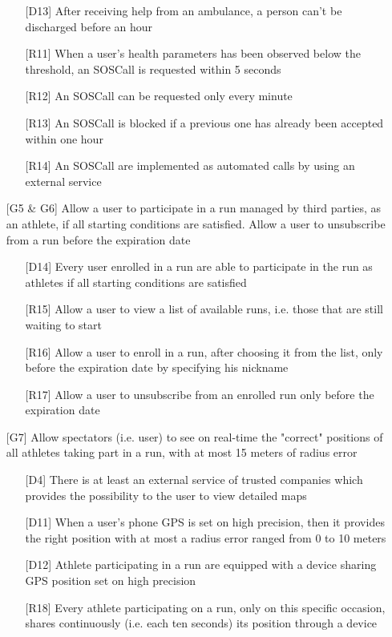 \begin{itemize}
\begin{itemize}
	\item[{[D13]}] After receiving help from an ambulance, a person can't be discharged before an hour
	\item[{[R11]}] When a user's health parameters has been observed below the threshold, an SOSCall is requested within 5 seconds
	\item[{[R12]}] An SOSCall can be requested only every minute
	\item[{[R13]}] An SOSCall is blocked if a previous one has already been accepted within one hour
	\item[{[R14]}] An SOSCall are implemented as automated calls by using an external service
	\end{itemize}
\item[{[G5 \& G6]}] Allow a user to participate in a run managed by third parties, as an athlete, if all starting conditions are satisfied. Allow a user to unsubscribe from a run before the expiration date
	\begin{itemize}
	\item[{[D14]}] Every user enrolled in a run are able to participate in the run as athletes if all starting conditions are satisfied
	\item[{[R15]}] Allow a user to view a list of available runs, i.e. those that are still waiting to start 
	\item[{[R16]}] Allow a user to enroll in a run, after choosing it from the list, only before the expiration date by specifying his nickname
	\item[{[R17]}] Allow a user to unsubscribe from an enrolled run only before the expiration date
	\end{itemize}
\item[{[G7]}] Allow spectators (i.e. user) to see on real-time the "correct" positions of all athletes taking part in a run, with at most 15 meters of radius error
	\begin{itemize}
	\item[{[D4]}] There is at least an external service of trusted companies which provides the possibility to the user to view detailed maps
	\item[{[D11]}] When a user's phone GPS is set on high precision, then it provides the right position with at most a radius error ranged from 0 to 10 meters
	\item[{[D12]}] Athlete participating in a run are equipped with a device sharing GPS position set on high precision
	\item[{[R18]}] Every athlete participating on a run, only on this specific occasion, shares continuously (i.e. each ten seconds) its position through a device

\end{itemize}
\end{itemize}
